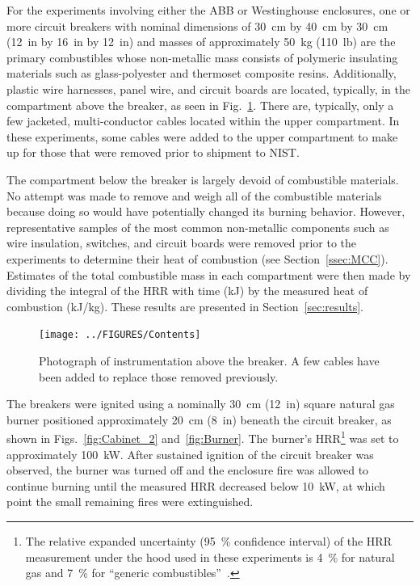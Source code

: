 For the experiments involving either the ABB or Westinghouse enclosures, one or more circuit breakers with nominal dimensions of 30~cm by 40~cm by 30~cm (12~in by 16~in by 12~in) and masses of approximately 50~kg (110~lb) are the primary combustibles whose non-metallic mass consists of polymeric insulating materials such as glass-polyester and thermoset composite resins. Additionally, plastic wire harnesses, panel wire, and circuit boards are located, typically, in the compartment above the breaker, as seen in Fig.~\ref{fig:Contents}. There are, typically, only a few jacketed, multi-conductor cables located within the upper compartment. In these experiments, some cables were added to the upper compartment to make up for those that were removed prior to shipment to NIST.

The compartment below the breaker is largely devoid of combustible materials. No attempt was made to remove and weigh all of the combustible materials because doing so would have potentially changed its burning behavior. However, representative samples of the most common non-metallic components such as wire insulation, switches, and circuit boards were removed prior to the experiments to determine their heat of combustion (see Section~\ref{ssec:MCC}). Estimates of the total combustible mass in each compartment were then made by dividing the integral of the HRR with time (kJ) by the measured heat of combustion (kJ/kg). These results are presented in Section~\ref{sec:results}.

\begin{figure}[t]
\centering
\texttt{[image: ../FIGURES/Contents]}
\caption[Photograph of instrumentation above the breaker] {Photograph of instrumentation above the breaker. A few cables have been added to replace those removed previously.}
\label{fig:Contents}
\end{figure}

The breakers were ignited using a nominally 30~cm (12~in) square natural gas burner positioned approximately 20~cm (8~in) beneath the circuit breaker, as shown in Figs.~\ref{fig:Cabinet_2} and~\ref{fig:Burner}. The burner's HRR\footnote{The relative expanded uncertainty (95~\% confidence interval) of the HRR measurement under the hood used in these experiments is 4~\% for natural gas and 7~\% for ``generic combustibles''~\cite{bryant2019nist}.} was set to approximately 100~kW. After sustained ignition of the circuit breaker was observed, the burner was turned off and the enclosure fire was allowed to continue burning until the measured HRR decreased below 10~kW, at which point the small remaining fires were extinguished.

